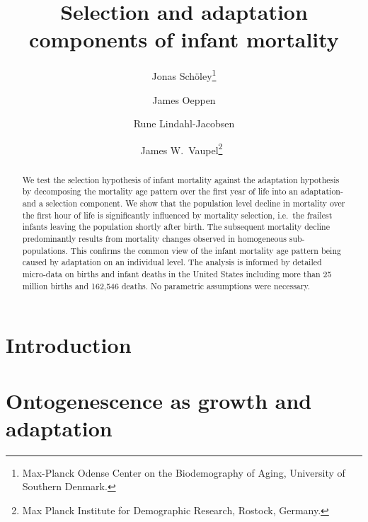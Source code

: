 \documentclass[12pt, parskip=half]{scrartcl}
\title{Selection and adaptation components of infant mortality}
\author{
  Jonas Schöley\thanks{Max-Planck Odense Center on the Biodemography of Aging, University of Southern Denmark.}
  \and
  James Oeppen\footnotemark[1]
  \and
  Rune Lindahl-Jacobsen\footnotemark[1]
  \and
  James W.~Vaupel\thanks{Max Planck Institute for Demographic Research, Rostock, Germany.}~\footnotemark[1]
}
\begin{document}
\maketitle

\thispagestyle{empty}

\begin{abstract}
We test the selection hypothesis of infant mortality against the adaptation hypothesis by decomposing the mortality age pattern over the first year of life into an adaptation- and a selection component.  We show that the population level decline in mortality over the first hour of life is significantly influenced by mortality selection, i.e.~the frailest infants leaving the population shortly after birth. The subsequent mortality decline predominantly results from mortality changes observed in homogeneous sub-populations. This confirms the common view of the infant mortality age pattern being caused by adaptation on an individual level. The analysis is informed by detailed micro-data on births and infant deaths in the United States including more than 25 million births and 162,546 deaths. No parametric assumptions were necessary.
\end{abstract}

\clearpage


\section{Introduction}



\section{Ontogenescence as growth and adaptation}

\end{document}
